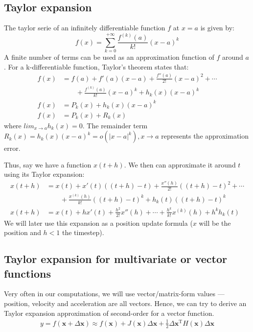 \documentclass{article}
\begin{document}
\subsection{Taylor expansion}
The taylor serie of an infinitely differentiable function $f$ at $x=a$ is given by:
\[
f(x) = \sum_{k=0}^{+\infty} \frac{f^{(k)}(a)}{k!}(x-a)^k
\]
A finite number of terms can be used as an approximation function of $f$ around $a$.
For a k-differentiable function, Taylor's theorem states that:
\begin{align*}
    f(x) &= f(a) + f'(a)(x-a) + \frac{f''(a)}{2!}(x-a)^2 + \cdots \\ &\qquad {} +\frac{f^{(k)}(a)}{k!}(x-a)^k + h_k(x)(x-a)^k \\
    f(x) &= P_k(x) + h_k(x)(x-a)^k \\
    f(x) &= P_k(x) + R_k(x)
\end{align*} where $lim_{x\to a}h_k(x)=0$. \newline
The remainder term $R_k(x) = h_k(x)(x-a)^k = o(|x-a|^k),  x \longrightarrow a$ represents the approximation error.

Thus, say we have a function $x(t+h)$. We then can approximate it around $t$ using its Taylor expansion:
\begin{align*}
    x(t+h) &= x(t) + x'(t)((t+h)-t) + \frac{x''(h)}{2!}((t+h)-t)^2 + \cdots \\ &\qquad {} +\frac{x^{(k)}(h)}{k!}((t+h)-t)^k + h_k(t)((t+h)-t)^k \\
    x(t+h) &= x(t) + h x'(t) + \frac{h^2}{2!}x''(h)+ \cdots + \frac{h^k}{k!}x^{(k)}(h) +  h^k h_k(t) 
\end{align*}
We will later use this expansion as a position update formula ($x$ will be the position and $h<1$ the timestep).

\subsection{Taylor expansion for multivariate or vector functions} 
Very often in our computations, we will use vector/matrix-form values --- position, velocity and acceleration are all vectors.
Hence, we can try to derive an Taylor expansion approximation of second-order for a vector function.
\begin{align}
    y=f(\mathbf{x}+\Delta\mathbf{x})\approx f(\mathbf{x}) + J(\mathbf{x})\Delta \mathbf{x} +\frac{1}{2} \Delta\mathbf{x}^\mathrm{T} H(\mathbf{x}) \Delta\mathbf{x}
\end{align}
\end{document}
